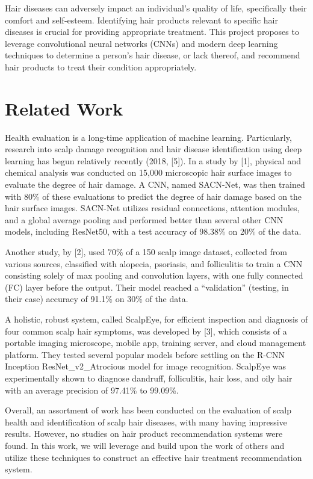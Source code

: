 \documentclass[10pt,twocolumn,letterpaper]{article}
\begin{document}
Hair diseases can adversely impact an individual's quality of life, specifically their comfort and self-esteem. Identifying hair products relevant to specific hair diseases is crucial for providing appropriate treatment. This project proposes to leverage convolutional neural networks (CNNs) and modern deep learning techniques to determine a person's hair disease, or lack thereof, and recommend hair products to treat their condition appropriately.
\section{Related Work}
Health evaluation is a long-time application of machine learning. Particularly, research into scalp damage recognition and hair disease identification using deep learning has begun relatively recently (2018, [5]). In a study by [1], physical and chemical analysis was conducted on 15,000 microscopic hair surface images to evaluate the degree of hair damage. A CNN, named SACN-Net, was then trained with 80\% of these evaluations to predict the degree of hair damage based on the hair surface images. SACN-Net utilizes residual connections, attention modules, and a global average pooling and performed better than several other CNN models, including ResNet50, with a test accuracy of 98.38\% on 20\% of the data.

Another study, by [2], used 70\% of a 150 scalp image dataset, collected from various sources, classified with alopecia, psoriasis, and folliculitis to train a CNN consisting solely of max pooling and convolution layers, with one fully connected (FC) layer before the output. Their model reached a “validation” (testing, in their case) accuracy of 91.1\% on 30\% of the data. 

A holistic, robust system, called ScalpEye, for efficient inspection and diagnosis of four common scalp hair symptoms, was developed by [3], which consists of a portable imaging microscope, mobile app, training server, and cloud management platform. They tested several popular models before settling on the R-CNN Inception ResNet\_v2\_Atrocious model for image recognition. ScalpEye was experimentally shown to diagnose dandruff, folliculitis, hair loss, and oily hair with an average precision of 97.41\% to 99.09\%.

Overall, an assortment of work has been conducted on the evaluation of scalp health and identification of scalp hair diseases, with many having impressive results. However, no studies on hair product recommendation systems were found. In this work, we will leverage and build upon the work of others and utilize these techniques to construct an effective hair treatment recommendation system.
\end{document}
